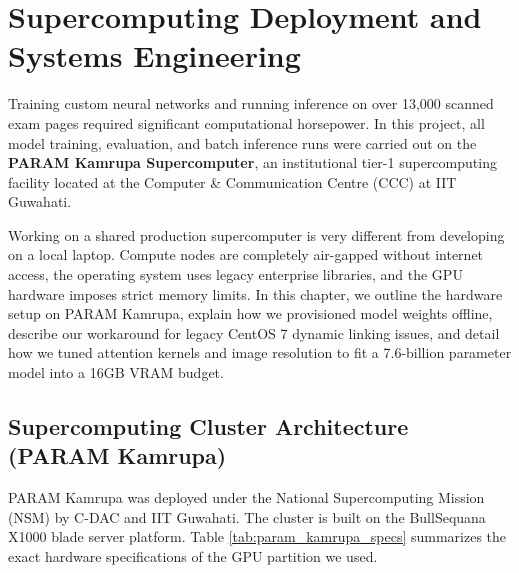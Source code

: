 \chapter{Supercomputing Deployment and Systems Engineering}
\label{ch:supercomputing}

Training custom neural networks and running inference on over 13,000 scanned exam pages required significant computational horsepower. In this project, all model training, evaluation, and batch inference runs were carried out on the \textbf{PARAM Kamrupa Supercomputer}, an institutional tier-1 supercomputing facility located at the Computer \& Communication Centre (CCC) at IIT Guwahati.

Working on a shared production supercomputer is very different from developing on a local laptop. Compute nodes are completely air-gapped without internet access, the operating system uses legacy enterprise libraries, and the GPU hardware imposes strict memory limits. In this chapter, we outline the hardware setup on PARAM Kamrupa, explain how we provisioned model weights offline, describe our workaround for legacy CentOS 7 dynamic linking issues, and detail how we tuned attention kernels and image resolution to fit a 7.6-billion parameter model into a 16GB VRAM budget.

\section{Supercomputing Cluster Architecture (PARAM Kamrupa)}
\label{sec:hpc_architecture}

PARAM Kamrupa was deployed under the National Supercomputing Mission (NSM) by C-DAC and IIT Guwahati. The cluster is built on the BullSequana X1000 blade server platform. Table \ref{tab:param_kamrupa_specs} summarizes the exact hardware specifications of the GPU partition we used.

